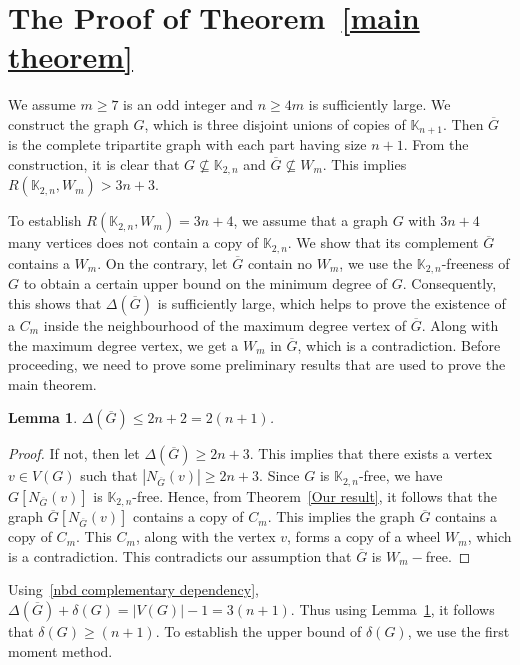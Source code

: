 \documentclass[reqno,10pt]{amsart}
\newtheorem{lemma}[theorem]{Lemma}
\theoremstyle{definition}
\begin{document}
\section{The Proof of Theorem~\ref{main theorem}}

We assume $m\geq 7$ is an odd integer and $n\geq 4m$ is sufficiently large. We construct the graph $G$, which is three disjoint unions of copies of $\mathbb{K}_{n+1}$. Then $\overline{G}$ is the complete tripartite graph with each part having size $n+1$. From the construction, it is clear that $G\not\subseteq \mathbb{K}_{2,n}$ and $\overline{G}\not\subseteq W_{m}$. This implies $R(\mathbb{K}_{2,n}, W_{m})>3n+3$.

To establish $R(\mathbb{K}_{2,n}, W_{m})=3n+4$, we assume that a graph $G$ with $3n+4$ many vertices does not contain a copy of $\mathbb{K}_{2,n}$. We show that its complement $\overline{G}$ contains a $W_{m}$. On the contrary, let $\overline{G}$ contain no $W_{m}$, we use the $\mathbb{K}_{2,n}$-freeness of $G$ to obtain a certain upper bound on the minimum degree of $G$. Consequently, this shows that $\Delta(\overline{G})$ is sufficiently large, which helps to prove the existence of a $C_{m}$ inside the neighbourhood of the maximum degree vertex of $\overline{G}$. Along with the maximum degree vertex, we get a $W_{m}$ in $\overline{G}$, which is a contradiction. Before proceeding, we need to prove some preliminary results that are used to prove the main theorem.

\begin{lemma}\label{upper bound Del(barG)}
 $\Delta(\overline{G})\leq 2n+2=2(n+1)$. 
\end{lemma}
\begin{proof}
If not, then let $\Delta(\overline{G})\geq 2n+3$. This implies that there exists a vertex $v\in V(G)$ such that $|N_{\overline{G}}(v)|\geq 2n+3$. Since $G$ is $\mathbb{K}_{2,n}$-free, we have $G[N_{\overline{G}}(v)]$ is $\mathbb{K}_{2,n}$-free. Hence, from Theorem~\ref{Our result}, it follows that the graph $\overline{G}[N_{\overline{G}}(v)]$ contains a copy of $C_{m}$. This implies the graph $\overline{G}$ contains a copy of $C_{m}$. This $C_{m}$, along with the vertex $v$, forms a copy of a wheel $W_{m}$, which is a contradiction. This contradicts our assumption that $\overline{G}$ is $W_{m}-$free. 
\end{proof}

Using~\eqref{nbd complementary dependency}, $\Delta(\overline{G})+\delta(G)=|V(G)|-1=3(n+1)$. Thus  using Lemma~\ref{upper bound Del(barG)}, it follows that $\delta(G)\geq (n+1)$. To establish the upper bound of $\delta(G)$, we use the first moment method.
\end{document}
